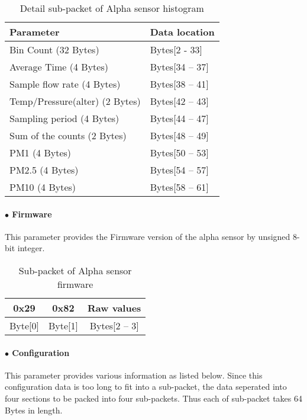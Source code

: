 \begin{table}[h!]
    \centering
    \caption{Detail sub-packet of Alpha sensor histogram}
    \begin{tabular}{|>{\centering\arraybackslash}p{}|>{\centering\arraybackslash}p{}|}
        \hline
        \rowcolor{black!8}
        \textbf{Parameter} & \textbf{Data location}\\ \hline
        Bin Count (32 Bytes) & Bytes[2 - 33] \\ \hline
        Average Time (4 Bytes) & Bytes[34 -- 37] \\ \hline
        Sample flow rate (4 Bytes) & Bytes[38 -- 41] \\ \hline
        Temp/Pressure(alter) (2 Bytes) & Bytes[42 -- 43] \\ \hline
        Sampling period (4 Bytes) & Bytes[44 -- 47] \\ \hline
        Sum of the counts (2 Bytes) & Bytes[48 -- 49] \\ \hline
        PM1 (4 Bytes) & Bytes[50 -- 53] \\ \hline
        PM2.5 (4 Bytes) & Bytes[54 -- 57] \\ \hline
        PM10 (4 Bytes) & Bytes[58 -- 61] \\ \hline
    \end{tabular}
\end{table}


\paragraph{$\bullet$ Firmware}
This parameter provides the Firmware version of the alpha sensor by unsigned 8-bit integer.\\


\begin{table}[h!]
    \centering
    \caption{Sub-packet of Alpha sensor firmware}
    \begin{tabular}{|c|c|c|}
        \hline
        \rowcolor{black!8}
        \textbf{0x29} & \textbf{0x82} & \textbf{Raw values}\\
        \hline
        Byte[0] & Byte[1] & Bytes[2 -- 3] \\ \hline
    \end{tabular}
\end{table}


\paragraph{$\bullet$ Configuration}
This parameter provides various information as listed below.
Since this configuration data is too long to fit into a sub-packet, the data seperated into four sections to be packed into four sub-packets. Thus each of sub-packet takes 64 Bytes in length.


